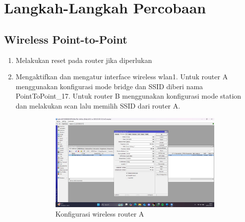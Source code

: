 \section{Langkah-Langkah Percobaan}
\subsection{Wireless Point-to-Point}
\begin{enumerate}
	\item Melakukan reset pada router jika diperlukan
	\item Mengaktifkan dan mengatur interface wireless wlan1. Untuk router A menggunakan konfigurasi mode bridge dan SSID diberi nama PointToPoint\_17. Untuk router B menggunakan konfigurasi mode station dan melakukan scan lalu memilih SSID dari router A.
	\begin{figure}[H]
		\centering
		\begin{subfigure}[b]{0.4\linewidth}
			\centering
			\includegraphics[width=\linewidth]{P3/img/ptp rtrA 1.jpg}
			\caption{Konfigurasi wireless router A\label{fig:konfigurasiR1}}
		\end{subfigure}
		\begin{subfigure}[b]{0.4\linewidth}
			\centering

\end{subfigure}
\end{figure}
\end{enumerate}
